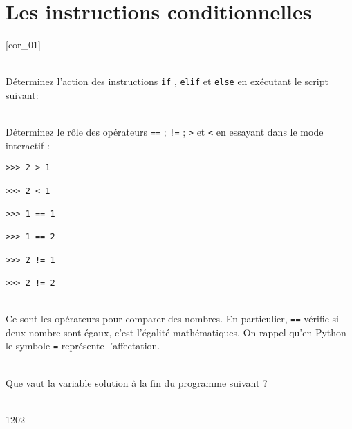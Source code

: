 \documentclass[a4paper,12pt]{article}
\newcommand{\numero}{8}                                    %
\begin{document}


\setcounter{section}{\numero}
\section{Les instructions conditionnelles}				
[cor_01]

\exo{}  ~\\ 
Déterminez l’action des instructions \lstinline{if} , \lstinline{elif} et \lstinline{else} en exécutant le script suivant:
		

\finexo

\exo{}  ~\\ 
Déterminez le rôle des opérateurs  \lstinline{==}  ;  \lstinline{!=}  ;  \lstinline{>}  et  \lstinline{<}  en essayant dans le mode interactif : 
\begin{lstlisting}[numbers=none]
>>> 2 > 1

>>> 2 < 1

>>> 1 == 1

>>> 1 == 2

>>> 2 != 1

>>> 2 != 2	

\end{lstlisting}
\begin{correction}
	~\\ 
	Ce sont les opérateurs pour comparer des nombres. En particulier, \lstinline{==} vérifie si deux nombre sont égaux, c'est l'égalité mathématiques. On rappel qu'en Python le symbole \lstinline{=} représente l'affectation.
	
\end{correction}
\finexo

\exo{}  ~\\ 
Que vaut la variable solution à la fin du programme suivant ? %

\begin{correction}
	~\\ 
	1202
\end{correction}
\finexo
\end{document}
